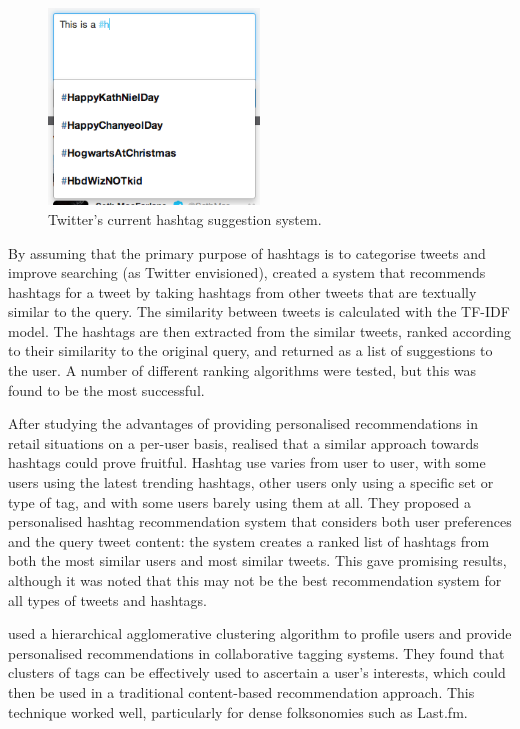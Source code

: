 \documentclass[11pt,a4paper]{report}
\begin{document}
\begin{figure}[htpb]
    \centering
    \includegraphics[width=0.5\textwidth]{twittersuggest.png}
    \caption{Twitter's current hashtag suggestion system.\label{fig:twittersuggest}}
\end{figure}

By assuming that the primary purpose of hashtags is to categorise tweets and improve searching (as Twitter envisioned), \textcite{Zangerle:2011} created a system that recommends hashtags for a tweet by taking hashtags from other tweets that are textually similar to the query. The similarity between tweets is calculated with the TF-IDF model. The hashtags are then extracted from the similar tweets, ranked according to their similarity to the original query, and returned as a list of suggestions to the user. A number of different ranking algorithms were tested, but this was found to be the most successful.

After studying the advantages of providing personalised recommendations in retail situations on a per-user basis, \textcite{Kywe:2012} realised that a similar approach towards hashtags could prove fruitful. Hashtag use varies from user to user, with some users using the latest trending hashtags, other users only using a specific set or type of tag, and with some users barely using them at all. They proposed a personalised hashtag recommendation system that considers both user preferences and the query tweet content: the system creates a ranked list of hashtags from both the most similar users and most similar tweets. This gave promising results, although it was noted that this may not be the best recommendation system for all types of tweets and hashtags.

\textcite{Shepitsen:2008} used a hierarchical agglomerative clustering algorithm to profile users and provide personalised recommendations in collaborative tagging systems. They found that clusters of tags can be effectively used to ascertain a user's interests, which could then be used in a traditional content-based recommendation approach. This technique worked well, particularly for dense folksonomies such as Last.fm.
\end{document}
